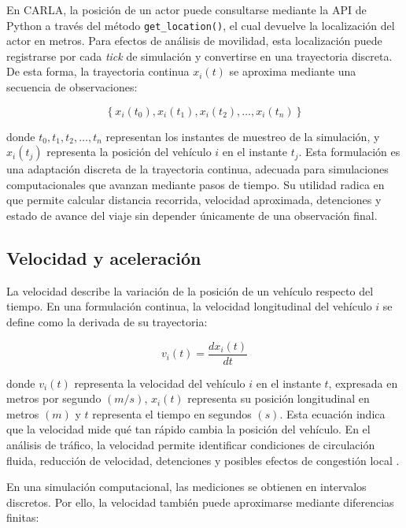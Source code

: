 En CARLA, la posición de un actor puede consultarse mediante la API de Python a través del método \texttt{get\_location()}, el cual devuelve la localización del actor en metros. Para efectos de análisis de movilidad, esta localización puede registrarse por cada \textit{tick} de simulación y convertirse en una trayectoria discreta. De esta forma, la trayectoria continua \(x_i(t)\) se aproxima mediante una secuencia de observaciones:

\begin{equation}
\left\{x_i(t_0), x_i(t_1), x_i(t_2), \ldots, x_i(t_n)\right\}
\label{eq:trayectoria_discreta}
\end{equation}

donde \(t_0, t_1, t_2, \ldots, t_n\) representan los instantes de muestreo de la simulación, y \(x_i(t_j)\) representa la posición del vehículo \(i\) en el instante \(t_j\). Esta formulación es una adaptación discreta de la trayectoria continua, adecuada para simulaciones computacionales que avanzan mediante pasos de tiempo. Su utilidad radica en que permite calcular distancia recorrida, velocidad aproximada, detenciones y estado de avance del viaje sin depender únicamente de una observación final.

\subsection{Velocidad y aceleración}
\label{subsubsec:velocidad_aceleracion}

La velocidad describe la variación de la posición de un vehículo respecto del tiempo. En una formulación continua, la velocidad longitudinal del vehículo \(i\) se define como la derivada de su trayectoria:

\begin{equation}
v_i(t)=\frac{dx_i(t)}{dt}
\label{eq:velocidad_continua}
\end{equation}

donde \(v_i(t)\) representa la velocidad del vehículo \(i\) en el instante \(t\), expresada en metros por segundo \((m/s)\), \(x_i(t)\) representa su posición longitudinal en metros \((m)\) y \(t\) representa el tiempo en segundos \((s)\). Esta ecuación indica que la velocidad mide qué tan rápido cambia la posición del vehículo. En el análisis de tráfico, la velocidad permite identificar condiciones de circulación fluida, reducción de velocidad, detenciones y posibles efectos de congestión local \cite{immers2005trafficflow,fhwa2001trafficflow}.

En una simulación computacional, las mediciones se obtienen en intervalos discretos. Por ello, la velocidad también puede aproximarse mediante diferencias finitas:

